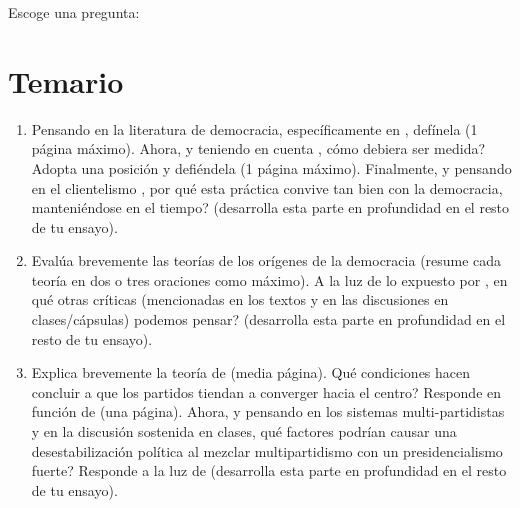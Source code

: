 \documentclass[onesided]{article}\usepackage[]{graphicx}\usepackage[]{color}
\begin{document}
Escoge una pregunta:

\section*{Temario}

\begin{enumerate}
	\item Pensando en la literatura de democracia, espec\'ificamente en \textcite{Lijphart2012,Schmitter1991,Collier1997}, def\'inela (1 p\'agina m\'aximo). Ahora, y teniendo en cuenta \textcite{Munck2002,Alvarez1996}, c\'omo debiera ser medida? Adopta una posici\'on y defi\'endela (1 p\'agina m\'aximo). Finalmente, y pensando en el clientelismo \parencite{Kitschelt2000,Auyero2000,Bahamonde2020a}, por qu\'e esta pr\'actica convive tan bien con la democracia, manteni\'endose en el tiempo? (desarrolla esta parte en profundidad en el resto de tu ensayo).
	\item Eval\'ua brevemente las teor\'ias de los or\'igenes de la democracia \parencite{Lipset1959,Przeworski1997,Moore:1966tn,Collier:1999rz,Boix:2003db,Acemoglu:1996rm} (resume cada teor\'ia en dos o tres oraciones como m\'aximo). A la luz de lo expuesto por \textcite{Haggard2012,Ansell:2014ty}, en qu\'e otras cr\'iticas (mencionadas en los textos y en las discusiones en clases/c\'apsulas) podemos pensar? (desarrolla esta parte en profundidad en el resto de tu ensayo).
	\item Explica brevemente la teor\'ia de \textcite{Downs:1957vg} (media p\'agina). Qu\'e condiciones hacen concluir a \textcite{Downs:1957vg} que los partidos tiendan a converger hacia el centro? Responde en funci\'on de \textcite{Boix:1999tj} (una p\'agina). Ahora, y pensando en los sistemas multi-partidistas y en la discusi\'on sostenida en clases, qu\'e factores podr\'ian causar una desestabilizaci\'on pol\'itica al mezclar multipartidismo con un presidencialismo fuerte? Responde a la luz de \textcite{Lijphart1990,Linz1985,Mainwaring1985} (desarrolla esta parte en profundidad en el resto de tu ensayo).
\end{enumerate}



\newpage
{}
\setcounter{page}{1}
\printbibliography
\end{document}
